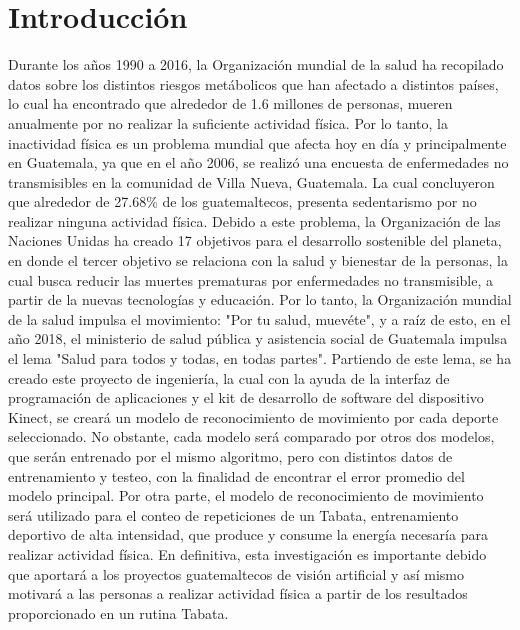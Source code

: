 \chapter{Introducci\'on}
Durante los a\~nos 1990 a 2016, la Organizaci\'on mundial de la salud ha recopilado datos sobre los distintos riesgos met\'abolicos que han afectado a distintos pa\'ises, lo cual ha encontrado que alrededor de 1.6 millones de personas, mueren anualmente por no realizar la suficiente actividad f\'isica. Por lo tanto, la inactividad f\'isica es un problema mundial que afecta hoy en d\'ia y principalmente en Guatemala, ya que en el a\~no 2006, se realiz\'o una encuesta de enfermedades no transmisibles en la comunidad de Villa Nueva, Guatemala. La cual concluyeron que alrededor de 27.68\% de los guatemaltecos, presenta sedentarismo por no realizar ninguna actividad f\'isica.
\medbreak
Debido a este problema, la Organizaci\'on de las Naciones Unidas ha creado 17 objetivos para el desarrollo sostenible del planeta, en donde el tercer objetivo se relaciona con la salud y bienestar de la personas, la cual busca reducir las muertes prematuras por enfermedades no transmisible, a partir de la nuevas tecnolog\'ias y educaci\'on. Por lo tanto, la Organizaci\'on mundial de la salud impulsa el movimiento: "Por tu salud, muev\'ete", y a ra\'iz de esto, en el a\~no 2018, el ministerio de salud p\'ublica y asistencia social de Guatemala impulsa el lema "Salud para todos y todas, en todas partes".
\medbreak
Partiendo de este lema, se ha creado este proyecto de ingenier\'ia, la cual con la ayuda de la interfaz de programaci\'on de aplicaciones y el kit de desarrollo de software del dispositivo Kinect, se crear\'a un modelo de reconocimiento de movimiento por cada deporte seleccionado. No obstante, cada modelo ser\'a comparado por otros dos modelos, que ser\'an entrenado por el mismo algoritmo, pero con distintos datos de entrenamiento y testeo, con la finalidad de encontrar el error promedio del modelo principal. 
\medbreak
Por otra parte, el modelo de reconocimiento de movimiento ser\'a utilizado para el conteo de repeticiones de un Tabata, entrenamiento deportivo de alta intensidad, que produce y consume la energ\'ia necesar\'ia para realizar actividad f\'isica.
\medbreak
En definitiva, esta investigaci\'on es importante debido que aportar\'a a los proyectos guatemaltecos de visi\'on artificial y as\'i mismo motivar\'a a las personas a realizar actividad f\'isica a partir de los resultados proporcionado en un rutina Tabata.

